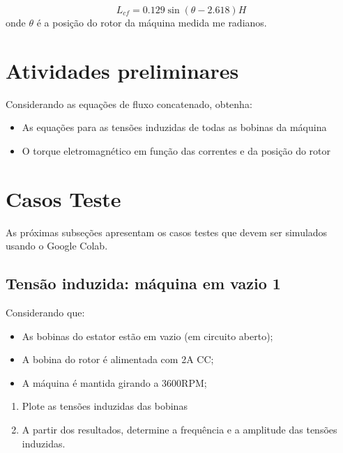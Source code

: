 \documentclass[a4paper]{article}
\theoremstyle{definition}
\theoremstyle{plain}
\begin{document}
\begin{equation}
L_{cf} = 0.129 \sin(\theta -2.618) H
\end{equation}
%
onde $\theta$ é a posição do rotor da máquina medida me radianos.

\section{Atividades preliminares}

Considerando as equações de fluxo concatenado, obtenha:

\begin{itemize}
\item As equações para as tensões induzidas de todas as bobinas da máquina
\item O torque eletromagnético em função das correntes e da posição do rotor
\end{itemize}


\section{Casos Teste}

As próximas subseções apresentam os casos testes que devem ser simulados usando o Google Colab.



\subsection{Tensão induzida: máquina em vazio 1}

Considerando que:

\begin{itemize}
\item As bobinas do estator estão em vazio (em circuito aberto);
\item A bobina do rotor é alimentada com 2A CC;
\item A máquina é mantida girando a 3600RPM;
\end{itemize}



\begin{enumerate}
\item Plote as tensões induzidas das bobinas
\item A partir dos resultados, determine a frequência e a amplitude das tensões induzidas.
\end{enumerate}
\end{document}
